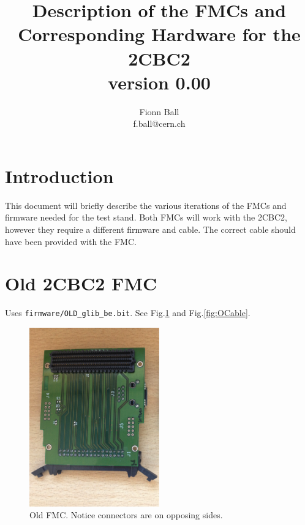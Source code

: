 \documentclass[11pt,a4paper]{article}
\begin{document}
\title{Description of the FMCs and Corresponding Hardware for the 2CBC2 \\ version 0.00}

\author{Fionn Ball\\
	f.ball@cern.ch}

	\maketitle
	\tableofcontents

	\section{Introduction}
	This document will briefly describe the various iterations of the FMCs and firmware needed for the test stand. Both FMCs will work with the 2CBC2, however they require a different firmware and cable. The correct cable should have been provided with the FMC.
	
	\section{Old 2CBC2 FMC}
	Uses \verb|firmware/OLD_glib_be.bit|. See Fig.\ref{fig:OFMC} and Fig.\ref{fig:OCable}.
	
\begin{figure} [htbp] 
        \centering
                \includegraphics[width=0.5\textwidth]{fig/OLD_FMC.png}
                \caption{Old FMC. Notice connectors are on opposing sides.}
                \label{fig:OFMC}
        \end{figure}
        
\end{document}
